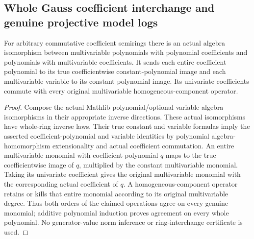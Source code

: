 \subsection{Whole Gauss coefficient interchange and genuine projective model logs}
\label{subsec:polynomial-coefficient-gauss-models}

\begin{theorem}
\label{polynomial:coefficient-variable-interchange}
\leanok
For arbitrary commutative coefficient semirings there is an actual algebra
isomorphism between multivariable polynomials with polynomial coefficients
and polynomials with multivariable coefficients. It sends each entire
coefficient polynomial to its true coefficientwise constant-polynomial
image and each multivariable variable to its constant polynomial image.
Its univariate coefficients commute with every original multivariable
homogeneous-component operator.
\end{theorem}
\begin{proof}
Compose the actual Mathlib polynomial/optional-variable algebra isomorphisms
in their appropriate inverse directions. These actual isomorphisms have
whole-ring inverse laws. Their true constant and variable formulas imply
the asserted coefficient-polynomial and variable identities by polynomial
algebra-homomorphism extensionality and actual coefficient commutation.
An entire multivariable monomial with coefficient polynomial $q$ maps to
the true coefficientwise image of $q$, multiplied by the constant
multivariable monomial. Taking its univariate coefficient gives the
original multivariable monomial with the corresponding actual coefficient
of $q$. A homogeneous-component operator retains or kills that entire
monomial according to its original multivariable degree. Thus both
orders of the claimed operations agree on every genuine monomial;
additive polynomial induction proves agreement on every whole polynomial.
No generator-value norm inference or ring-interchange certificate is used.
\end{proof}

